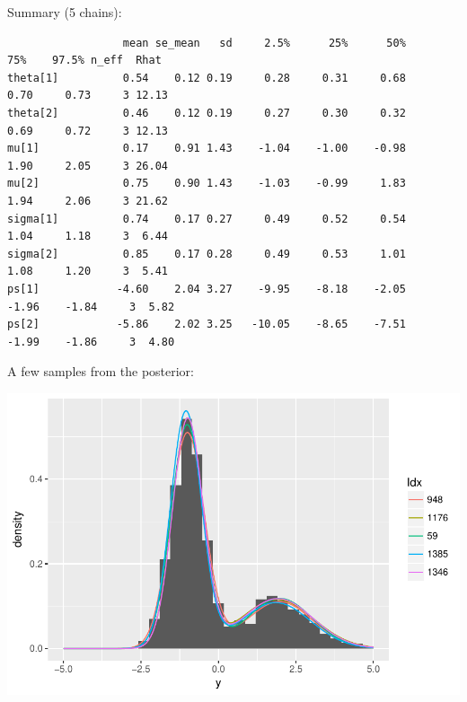 \begin{frame}[fragile]
\begin{analysis}[K=2]

\smallskip

Summary (5 chains):

\smallskip

\begin{tiny}

\begin{verbatim}
                  mean se_mean   sd     2.5%      25%      50%      75%    97.5% n_eff  Rhat
theta[1]          0.54    0.12 0.19     0.28     0.31     0.68     0.70     0.73     3 12.13
theta[2]          0.46    0.12 0.19     0.27     0.30     0.32     0.69     0.72     3 12.13
mu[1]             0.17    0.91 1.43    -1.04    -1.00    -0.98     1.90     2.05     3 26.04
mu[2]             0.75    0.90 1.43    -1.03    -0.99     1.83     1.94     2.06     3 21.62
sigma[1]          0.74    0.17 0.27     0.49     0.52     0.54     1.04     1.18     3  6.44
sigma[2]          0.85    0.17 0.28     0.49     0.53     1.01     1.08     1.20     3  5.41
ps[1]            -4.60    2.04 3.27    -9.95    -8.18    -2.05    -1.96    -1.84     3  5.82
ps[2]            -5.86    2.02 3.25   -10.05    -8.65    -7.51    -1.99    -1.86     3  4.80
\end{verbatim}
\smallskip
\end{tiny}

\end{analysis}
\end{frame}


\begin{frame}
\begin{analysis}[K=2]

\smallskip

A few samples from the posterior:

\smallskip

\begin{center}
\includegraphics[width=0.70\linewidth]{../LectureAssets/L07/fm_fit02}
\end{center}

\bigskip

\end{analysis}
\end{frame}

